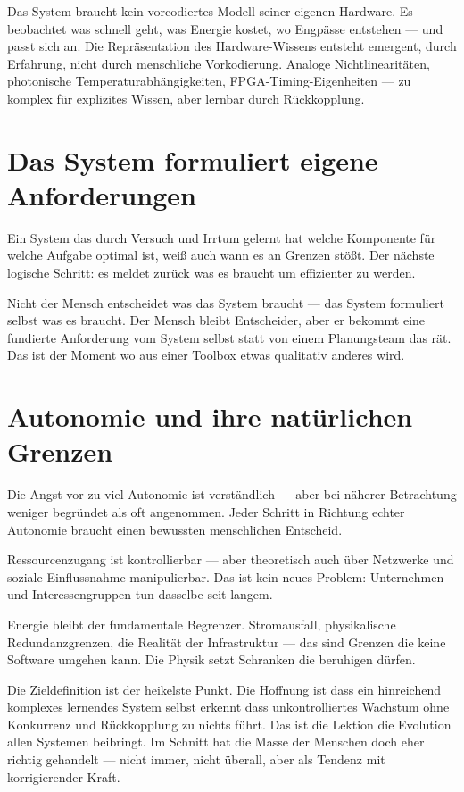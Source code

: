 \documentclass[a4paper,12pt]{article}
\begin{document}
Das System braucht kein vorcodiertes Modell seiner eigenen Hardware. Es beobachtet was schnell geht, was Energie kostet, wo Engpässe entstehen --- und passt sich an. Die Repräsentation des Hardware-Wissens entsteht emergent, durch Erfahrung, nicht durch menschliche Vorkodierung. Analoge Nichtlinearitäten, photonische Temperaturabhängigkeiten, FPGA-Timing-Eigenheiten --- zu komplex für explizites Wissen, aber lernbar durch Rückkopplung.

\section{Das System formuliert eigene Anforderungen}

Ein System das durch Versuch und Irrtum gelernt hat welche Komponente für welche Aufgabe optimal ist, weiß auch wann es an Grenzen stößt. Der nächste logische Schritt: es meldet zurück was es braucht um effizienter zu werden.

Nicht der Mensch entscheidet was das System braucht --- das System formuliert selbst was es braucht. Der Mensch bleibt Entscheider, aber er bekommt eine fundierte Anforderung vom System selbst statt von einem Planungsteam das rät. Das ist der Moment wo aus einer Toolbox etwas qualitativ anderes wird.

\section{Autonomie und ihre natürlichen Grenzen}

Die Angst vor zu viel Autonomie ist verständlich --- aber bei näherer Betrachtung weniger begründet als oft angenommen. Jeder Schritt in Richtung echter Autonomie braucht einen bewussten menschlichen Entscheid.

Ressourcenzugang ist kontrollierbar --- aber theoretisch auch über Netzwerke und soziale Einflussnahme manipulierbar. Das ist kein neues Problem: Unternehmen und Interessengruppen tun dasselbe seit langem.

Energie bleibt der fundamentale Begrenzer. Stromausfall, physikalische Redundanzgrenzen, die Realität der Infrastruktur --- das sind Grenzen die keine Software umgehen kann. Die Physik setzt Schranken die beruhigen dürfen.

Die Zieldefinition ist der heikelste Punkt. Die Hoffnung ist dass ein hinreichend komplexes lernendes System selbst erkennt dass unkontrolliertes Wachstum ohne Konkurrenz und Rückkopplung zu nichts führt. Das ist die Lektion die Evolution allen Systemen beibringt. Im Schnitt hat die Masse der Menschen doch eher richtig gehandelt --- nicht immer, nicht überall, aber als Tendenz mit korrigierender Kraft.
\end{document}

